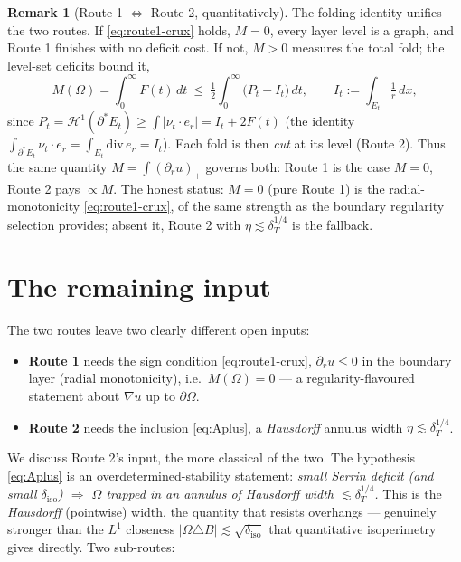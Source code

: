 \documentclass[11pt]{article}
\theoremstyle{definition}
\newtheorem{remark}[theorem]{Remark}
\newcommand{\Om}{\Omega}
\newcommand{\HH}{\mathcal H}
\newcommand{\dT}{\delta_T}
\newcommand{\diso}{\delta_{\mathrm{iso}}}
\newcommand{\abs}[1]{\left|#1\right|}
\begin{document}
\begin{remark}[Route 1 $\Leftrightarrow$ Route 2, quantitatively]
\label{rem:routes-equiv}
The folding identity unifies the two routes. If \eqref{eq:route1-crux}
holds, $M=0$, every layer level is a graph, and Route 1 finishes with no
deficit cost. If not, $M>0$ measures the total fold; the level-set deficits
bound it,
\begin{equation}\label{eq:M-bound}
   M(\Om)=\int_0^\infty F(t)\,dt\ \le\ \tfrac12\!\int_0^\infty\!\bigl(P_t-I_t\bigr)\,dt,
   \qquad I_t:=\int_{E_t}\tfrac1r\,dx,
\end{equation}
since $P_t=\HH^1(\partial^*E_t)\ge\int|\nu_t\cdot e_r|=I_t+2F(t)$ (the
identity $\int_{\partial^*E_t}\nu_t\cdot e_r=\int_{E_t}\mathrm{div}\,e_r=
I_t$). Each fold is then \emph{cut} at its level (Route 2). Thus the same
quantity $M=\int(\partial_r u)_+$ governs both: Route 1 is the case $M=0$,
Route 2 pays $\propto M$. The honest status: $M=0$ (pure Route 1) is the
radial-monotonicity \eqref{eq:route1-crux}, of the same strength as the
boundary regularity selection provides; absent it, Route 2 with
$\eta\lesssim\dT^{1/4}$ is the fallback.
\end{remark}

\section{The remaining input}
\label{sec:remaining}

The two routes leave two clearly different open inputs:
\begin{itemize}[leftmargin=2em]
\item \textbf{Route 1} needs the sign condition \eqref{eq:route1-crux},
$\partial_r u\le0$ in the boundary layer (radial monotonicity), i.e.\
$M(\Om)=0$ --- a regularity-flavoured statement about $\nabla u$ up to
$\partial\Om$.
\item \textbf{Route 2} needs the inclusion \eqref{eq:Aplus}, a
\emph{Hausdorff} annulus width $\eta\lesssim\dT^{1/4}$.
\end{itemize}
We discuss Route 2's input, the more classical of the two. The hypothesis
\eqref{eq:Aplus} is an overdetermined-stability statement: \emph{small
Serrin deficit (and small $\diso$) $\Rightarrow$ $\Om$ trapped in an
annulus of Hausdorff width $\lesssim\dT^{1/4}$.} This is the
\emph{Hausdorff} (pointwise) width, the quantity that resists overhangs ---
genuinely stronger than the $L^1$ closeness $\abs{\Om\triangle B}
\lesssim\sqrt{\diso}$ that quantitative isoperimetry gives directly. Two
sub-routes:
\end{document}
